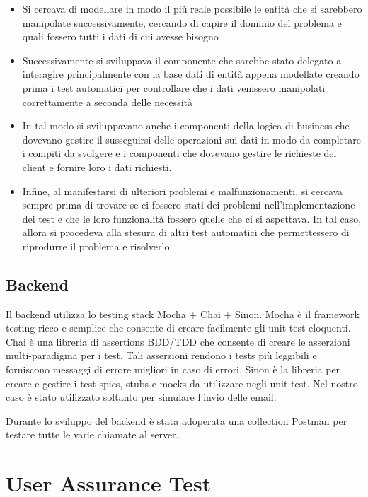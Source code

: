 \begin{itemize}

    \item Si cercava di modellare in modo il più reale possibile le entità che si sarebbero manipolate successivamente, cercando di capire il dominio del problema e quali fossero tutti i dati di cui avesse bisogno
    
    \item Successivamente si sviluppava il componente che sarebbe stato delegato a interagire principalmente con la base dati di entità appena modellate creando prima i test automatici per controllare che i dati venissero manipolati correttamente a seconda delle necessità
    
    \item In tal modo si sviluppavano anche i componenti della logica di business che dovevano gestire il susseguirsi delle operazioni sui dati in modo da completare i compiti da svolgere e i componenti che dovevano gestire le richieste dei client e fornire loro i dati richiesti.
    
    \item Infine, al manifestarsi di ulteriori problemi e malfunzionamenti, si cercava sempre prima di trovare se ci fossero stati dei problemi nell'implementazione dei test e che le loro funzionalità fossero quelle che ci si aspettava. In tal caso, allora si procedeva alla stesura di altri test automatici che permettessero di riprodurre il problema e risolverlo.
    
\end{itemize}

 \subsection{Backend}
 Il backend utilizza lo testing stack Mocha + Chai + Sinon. 
Mocha è il framework testing ricco e semplice che consente di creare facilmente
gli unit test eloquenti.
Chai è una libreria di assertions BDD/TDD che consente di creare le asserzioni
multi-paradigma per i test. Tali asserzioni rendono i tests più leggibili e forniscono messaggi di errore migliori in caso di errori. 
Sinon è la libreria per creare e gestire i test spies, stubs e mocks da utilizzare
negli unit test. Nel nostro caso è stato utilizzato soltanto per simulare l'invio delle email.

Durante lo sviluppo del backend è stata adoperata una collection Postman per testare tutte le varie chiamate al server. 

\section{User Assurance Test}
